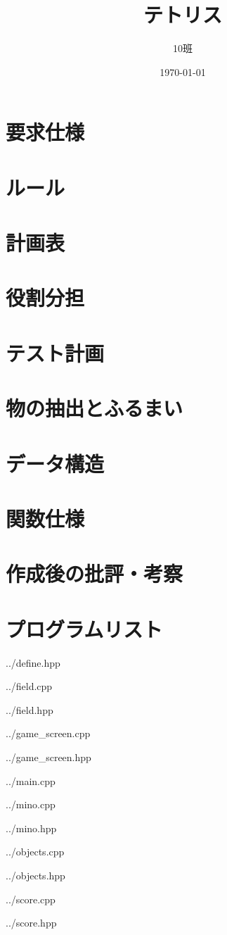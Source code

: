 \documentclass[11pt,a4paper]{jsarticle}
\title{テトリス}
\author{10班}
\date{\today}
\begin{document}
  \maketitle
  \clearpage
  \section{要求仕様}
    
  \clearpage
  \section{ルール}
    
  \clearpage
  \section{計画表}
    
  \clearpage
  \section{役割分担}
    
  \clearpage
  \section{テスト計画}
    
  \clearpage
  \section{物の抽出とふるまい}
    
  \clearpage
  \section{データ構造}
    
  \clearpage
  \section{関数仕様}
    
  \clearpage
  \section{作成後の批評・考察}
    
  \clearpage
  \section{プログラムリスト}
    
    {../define.hpp}
    
    {../field.cpp}
    
    {../field.hpp}
    
    {../game_screen.cpp}
    
    {../game_screen.hpp}
    
    {../main.cpp}
    
    {../mino.cpp}
    
    {../mino.hpp}
    
    {../objects.cpp}
    
    {../objects.hpp}
    
    {../score.cpp}
    
    {../score.hpp}
\end{document}
